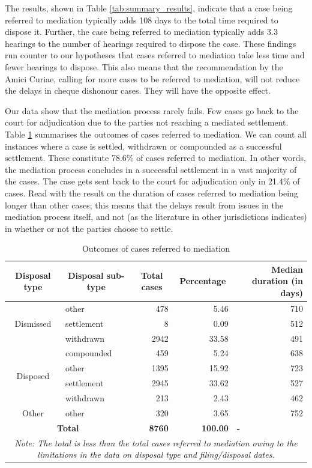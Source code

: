 \documentclass[12pt,a4paper]{article}
\begin{document}
The results, shown in Table \ref{tab:summary_results}, indicate that a case being referred to mediation typically adds 108 days to the total time required to dispose it. Further, the case being referred to mediation typically adds 3.3 hearings to the number of hearings required to dispose the case. These findings run counter to our hypotheses that cases referred to mediation take less time and fewer hearings to dispose. This also means that the recommendation by the Amici Curiae, calling for more cases to be referred to mediation, will not reduce the delays in cheque dishonour cases. They will have the opposite effect.

Our data show that the mediation process rarely fails. Few cases go back to the court for adjudication due to the parties not reaching a mediated settlement. Table \ref{tab:mediation} summarises the outcomes of cases referred to mediation. We can count all instances where a case is settled, withdrawn or compounded as a successful settlement. These constitute 78.6\% of cases referred to mediation. In other words, the mediation process concludes in a successful settlement in a vast majority of the cases. The case gets sent back to the court for adjudication only in 21.4\% of cases. Read with the result on the duration of cases referred to mediation being longer than other cases; this means that the delays result from issues in the mediation process itself, and not (as the literature in other jurisdictions indicates) in whether or not the parties choose to settle.

{\footnotesize \begin{longtable}{@{}clrrr@{}}
 \caption{Outcomes of cases referred to mediation}
 \label{tab:mediation}\\
 \toprule
 \textbf{Disposal type} & \multicolumn{1}{c}{\textbf{Disposal sub-type}} & \multicolumn{1}{c}{\textbf{Total cases}} & \multicolumn{1}{c}{\textbf{Percentage}} & \multicolumn{1}{p{3cm}}{\textbf{Median duration (in days)}} \\
 \midrule \endhead
 \multirow{3}{*}{Dismissed} & other & 478 & 5.46 & 710 \\
 & settlement & 8 & 0.09 & 512 \\
 & withdrawn & 2942 & 33.58 & 491 \\
 \midrule
 \multirow{4}{*}{Disposed} & compounded & 459 & 5.24 & 638 \\
 & other & 1395 & 15.92 & 723 \\
 & settlement & 2945 & 33.62 & 527 \\
 & withdrawn & 213 & 2.43 & 462 \\
 \midrule
 Other & other & 320 & 3.65 & 752 \\
 \midrule
 \multicolumn{2}{c}{\textbf{Total}} & \textbf{8760} & \textbf{100.00} & \multicolumn{1}{l}{\textbf{-}} \\
 \bottomrule \multicolumn{5}{p{11cm}}{{\footnotesize \emph{Note:
 The total is less than the total cases referred to mediation owing to the limitations in the data on disposal type and filing/disposal dates.}}}
 \end{longtable}}
\end{document}
